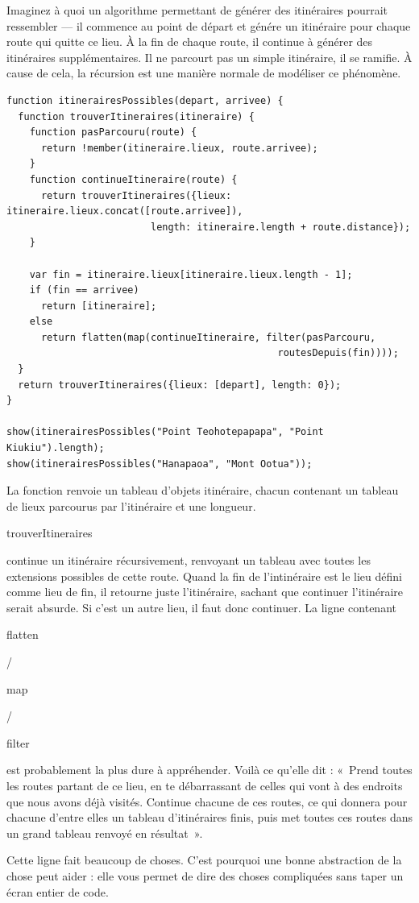 \documentclass{FramateX}
\renewcommand{\texttt}[1]{\begin{sffamily}{#1}\end{sffamily}}
\begin{document}
Imaginez à quoi un algorithme permettant de générer des itinéraires
pourrait ressembler --- il commence au point de départ et génére un
itinéraire pour chaque route qui quitte ce lieu. À la fin de chaque
route, il continue à générer des itinéraires supplémentaires. Il ne
parcourt pas un simple itinéraire, il se ramifie. À cause de cela, la
récursion est une manière normale de modéliser ce phénomène.

\begin{lstlisting}
function itinerairesPossibles(depart, arrivee) {
  function trouverItineraires(itineraire) {
    function pasParcouru(route) {
      return !member(itineraire.lieux, route.arrivee);
    }
    function continueItineraire(route) {
      return trouverItineraires({lieux: itineraire.lieux.concat([route.arrivee]),
                         length: itineraire.length + route.distance});
    }

    var fin = itineraire.lieux[itineraire.lieux.length - 1];
    if (fin == arrivee)
      return [itineraire];
    else
      return flatten(map(continueItineraire, filter(pasParcouru,
                                               routesDepuis(fin))));
  }
  return trouverItineraires({lieux: [depart], length: 0});
}

show(itinerairesPossibles("Point Teohotepapapa", "Point Kiukiu").length);
show(itinerairesPossibles("Hanapaoa", "Mont Ootua"));
\end{lstlisting}
La fonction renvoie un tableau d'objets itinéraire, chacun contenant un
tableau de lieux parcourus par l'itinéraire et une longueur.
\texttt{trouverItineraires} continue un itinéraire récursivement,
renvoyant un tableau avec toutes les extensions possibles de cette
route. Quand la fin de l'intinéraire est le lieu défini comme lieu de
fin, il retourne juste l'itinéraire, sachant que continuer l'itinéraire
serait absurde. Si c'est un autre lieu, il faut donc continuer. La ligne
contenant \texttt{flatten}/\texttt{map}/\texttt{filter} est probablement
la plus dure à appréhender. Voilà ce qu'elle dit : «~Prend toutes les
routes partant de ce lieu, en te débarrassant de celles qui vont à des
endroits que nous avons déjà visités. Continue chacune de ces routes, ce
qui donnera pour chacune d'entre elles un tableau d'itinéraires finis,
puis met toutes ces routes dans un grand tableau renvoyé en résultat~».

Cette ligne fait beaucoup de choses. C'est pourquoi une bonne
abstraction de la chose peut aider : elle vous permet de dire des choses
compliquées sans taper un écran entier de code.
\end{document}

